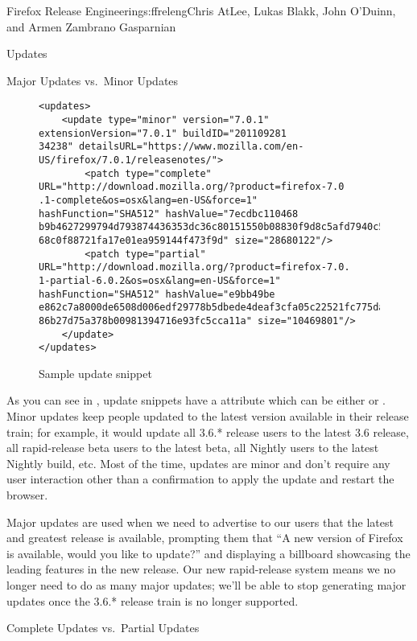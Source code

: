 \begin{aosachapter}{Firefox Release Engineering}{s:ffreleng}{Chris AtLee, Lukas Blakk, John O'Duinn, and Armen Zambrano Gasparnian}
\begin{aosasect1}{Updates}
\begin{aosasect2}{Major Updates vs.\ Minor Updates}

\begin{figure}  
\begin{verbatim}
<updates>
    <update type="minor" version="7.0.1" extensionVersion="7.0.1" buildID="201109281
34238" detailsURL="https://www.mozilla.com/en-US/firefox/7.0.1/releasenotes/">
        <patch type="complete" URL="http://download.mozilla.org/?product=firefox-7.0
.1-complete&os=osx&lang=en-US&force=1" hashFunction="SHA512" hashValue="7ecdbc110468
b9b4627299794d793874436353dc36c80151550b08830f9d8c5afd7940c51df9270d54e11fd99806f413
68c0f88721fa17e01ea959144f473f9d" size="28680122"/>
        <patch type="partial" URL="http://download.mozilla.org/?product=firefox-7.0.
1-partial-6.0.2&os=osx&lang=en-US&force=1" hashFunction="SHA512" hashValue="e9bb49be
e862c7a8000de6508d006edf29778b5dbede4deaf3cfa05c22521fc775da126f5057621960d327615b51
86b27d75a378b00981394716e93fc5cca11a" size="10469801"/>
    </update>
</updates>
\end{verbatim}
\caption{Sample update snippet}
\label{fig.ffreleng.snippet}
\end{figure}

As you can see in , update snippets
have a  attribute which can be either  or 
.
Minor updates keep people updated to the latest version
available in their release train; for example, it would update all
3.6.* release users to the latest 3.6 release, all rapid-release beta
users to the latest beta, all Nightly users to the
latest Nightly build, etc.  Most of the time, updates are minor and
don't require any user interaction other than a confirmation to apply the
update and restart the browser.

Major updates are used when we need to advertise to our users that the
latest and greatest release is available, prompting them that
``A new version of Firefox is available, would you
like to update?'' and displaying a billboard showcasing the leading 
features in the new release.  Our new rapid-release system means we no
longer need to do as many major updates; we'll be able to stop
generating major updates once the 3.6.* release train is no longer supported.

\end{aosasect2}

\begin{aosasect2}{Complete Updates vs.\ Partial Updates}


\end{aosasect2}
\end{aosasect1}
\end{aosachapter}
